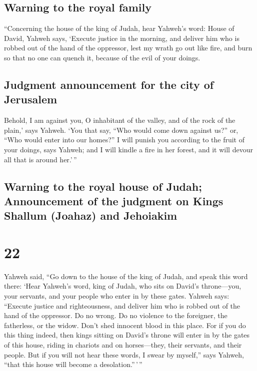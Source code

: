 \hypertarget{warning-to-the-royal-family}{%
\subsection{Warning to the royal
family}\label{warning-to-the-royal-family}}

 ``Concerning the house of the king of Judah, hear
Yahweh's word:  House of David, Yahweh says, `Execute
justice in the morning, and deliver him who is robbed out of the hand of
the oppressor, lest my wrath go out like fire, and burn so that no one
can quench it, because of the evil of your doings.

\hypertarget{judgment-announcement-for-the-city-of-jerusalem}{%
\subsection{Judgment announcement for the city of
Jerusalem}\label{judgment-announcement-for-the-city-of-jerusalem}}

 Behold, I am against you, O inhabitant of the valley,
and of the rock of the plain,' says Yahweh. `You that say, ``Who would
come down against us?'' or, ``Who would enter into our homes?''
 I will punish you according to the fruit of your doings,
says Yahweh; and I will kindle a fire in her forest, and it will devour
all that is around her.'\,''

\hypertarget{warning-to-the-royal-house-of-judah-announcement-of-the-judgment-on-kings-shallum-joahaz-and-jehoiakim}{%
\subsection{Warning to the royal house of Judah; Announcement of the
judgment on Kings Shallum (Joahaz) and
Jehoiakim}\label{warning-to-the-royal-house-of-judah-announcement-of-the-judgment-on-kings-shallum-joahaz-and-jehoiakim}}

\hypertarget{section-21}{%
\section{22}\label{section-21}}

 Yahweh said, ``Go down to the house of the king of Judah,
and speak this word there:  `Hear Yahweh's word, king of
Judah, who sits on David's throne---you, your servants, and your people
who enter in by these gates.  Yahweh says: ``Execute
justice and righteousness, and deliver him who is robbed out of the hand
of the oppressor. Do no wrong. Do no violence to the foreigner, the
fatherless, or the widow. Don't shed innocent blood in this place.
 For if you do this thing indeed, then kings sitting on
David's throne will enter in by the gates of this house, riding in
chariots and on horses---they, their servants, and their people.
 But if you will not hear these words, I swear by
myself,'' says Yahweh, ``that this house will become a
desolation.''\,'\,''


